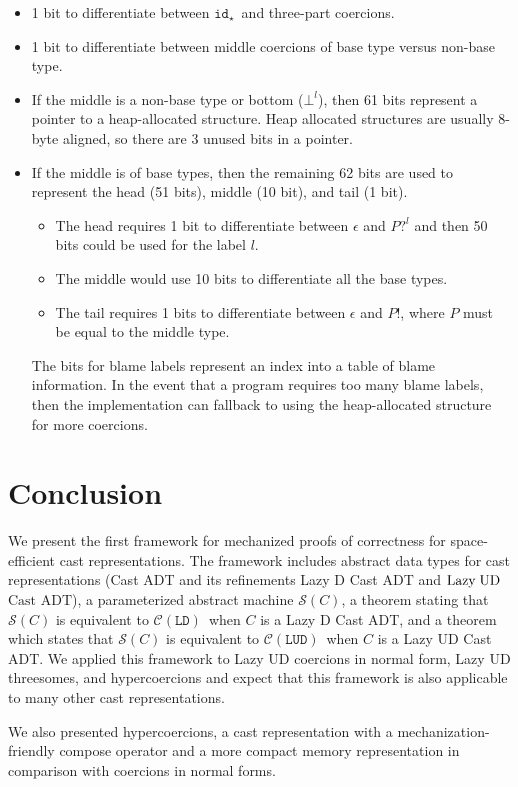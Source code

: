 \documentclass[runningheads]{llncs}
\newcommand{\LUD}{\ensuremath{\text{Lazy\;UD}}}
\newcommand{\CastADT}{\ensuremath{\text{Cast ADT}}}
\newcommand{\CMachine}[1]{\ensuremath{\mathcal{C}(#1)}}
\newcommand{\LDMachine}{\CMachine{\BLD}}
\newcommand{\LUDMachine}{\CMachine{\BLUD}}
\newcommand{\SMachine}[1]{\ensuremath{\mathcal{S}(#1)}}
\newcommand{\Tdyn}[0]{\ensuremath{\star}}
\newcommand{\BLD}[0]{\ensuremath{\mathtt{LD}}}
\newcommand{\BLUD}[0]{\ensuremath{\mathtt{LUD}}}
\newcommand{\cnfid}[1]{\ensuremath{\mathtt{id}_{#1}}}
\newcommand{\hcci}[0]{\cnfid{\Tdyn}}
\newcommand{\hche}[0]{\ensuremath{\epsilon}}
\newcommand{\hchp}[2]{\ensuremath{#1?^{#2}}}
\newcommand{\hcmfail}[1]{\ensuremath{\bot^l}}
\newcommand{\hcte}[0]{\ensuremath{\epsilon}}
\newcommand{\hcti}[1]{\ensuremath{#1!}}
\begin{document}
\begin{itemize}
\item 1 bit to differentiate between \hcci\ and three-part coercions.

\item 1 bit to differentiate between middle coercions of base type
versus non-base type.

\item If the middle is a non-base type or bottom ($\hcmfail{l}$), then 61 bits 
represent a
pointer to a heap-allocated structure. Heap allocated structures are
usually 8-byte aligned, so there are 3 unused bits in a pointer.

\item If the middle is of base types, then the remaining 62 bits are
used to represent the head (51 bits), middle (10 bit), and tail (1
bit).
\begin{itemize}
\item The head requires 1 bit to differentiate between $\hche$
and $\hchp{P}{l}$ and then 50 bits could be used for the label $l$.
\item The middle would use 10 bits to differentiate all the base types.
\item The tail requires 1 bits to differentiate between $\hcte$ and $\hcti{P}$, 
where $P$ must be equal to the middle type.
\end{itemize}
The bits for blame labels represent an index into a table of blame information.
In the event that a program requires too many blame labels, then the 
implementation
can fallback to using the heap-allocated structure for more
coercions.
\end{itemize}

\section{Conclusion} \label{sec:conclusion}

We present the first framework for mechanized proofs of correctness
for space-efficient cast representations.
%
The framework includes abstract data types for cast representations
(Cast ADT and its refinements Lazy D Cast ADT and \LUD\ \CastADT), a
parameterized abstract machine \SMachine{C}, a theorem stating that
\SMachine{C} is equivalent to \LDMachine\ when $C$ is a Lazy D Cast
ADT, and a theorem which states that \SMachine{C} is equivalent to
\LUDMachine\ when $C$ is a Lazy UD Cast ADT.
%
%
We applied this framework to Lazy UD coercions in normal form, Lazy UD
threesomes, and hypercoercions and expect that this framework is also
applicable to many other cast representations.

We also presented hypercoercions, a cast representation with a
mechanization-friendly compose operator and a more compact memory
representation in comparison with coercions in normal forms.

%
%
%
% 
% 
%
%

{}
\end{document}
